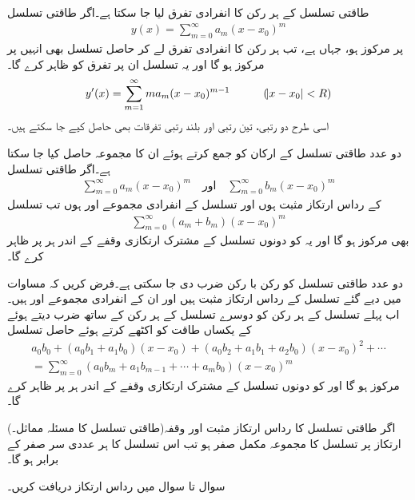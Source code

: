 \quad طاقتی تسلسل کے ہر رکن کا انفرادی تفرق لیا جا سکتا ہے۔اگر طاقتی تسلسل
\begin{align*}
y(x)=\sum_{m=0}^{\infty}a_m(x-x_0)^m
\end{align*}
  پر مرکوز ہو، جہاں  ہے، تب ہر رکن کا انفرادی تفرق لے کر حاصل تسلسل بھی انہیں  پر مرکوز ہو گا اور یہ تسلسل ان  پر  تفرق   کو ظاہر کرے گا۔ 
 \begin{align*}
y'(x)=\sum_{m=1}^{\infty} ma_m(x-x_0)^{m-1}\quad \quad \quad (\abs{x-x_0}<R)
\end{align*}
 اسی طرح دو رتبی، تین رتبی اور بلند رتبی تفرقات بھی حاصل کیے جا سکتے ہیں۔

\quad دو عدد طاقتی تسلسل کے ارکان کو جمع کرتے ہوئے ان کا مجموعہ حاصل کیا جا سکتا ہے۔اگر طاقتی تسلسل
\begin{align}\label{مساوات_بیسل_دو_عدد_تسلسل_الف}
\sum_{m=0}^{\infty} a_m(x-x_0)^m\quad \text{اور} \quad \sum_{m=0}^{\infty} b_m(x-x_0)^m
\end{align}
کے رداس ارتکاز مثبت ہوں اور تسلسل کے انفرادی مجموعے  اور  ہوں تب تسلسل
\begin{align*}
\sum_{m=0}^{\infty} (a_m+b_m)(x-x_0)^m
\end{align*}
بھی مرکوز ہو گا اور یہ  کو  دونوں تسلسل کے مشترک ارتکازی وقفے کے اندر ہر  پر ظاہر کرے گا۔

\quad دو عدد طاقتی تسلسل کو رکن با رکن ضرب دی جا سکتی ہے۔فرض کریں کہ مساوات  میں دیے گئے تسلسل کے رداس ارتکاز مثبت ہیں اور ان کے انفرادی مجموعے  اور  ہیں۔اب پہلے تسلسل کے ہر رکن کو دوسرے تسلسل کے ہر رکن کے ساتھ ضرب دیتے ہوئے  کے یکساں طاقت کو اکٹھے کرتے ہوئے حاصل تسلسل
\begin{multline*}
a_0b_0+(a_0b_1+a_1b_0)(x-x_0)+(a_0b_2+a_1b_1+a_2b_0)(x-x_0)^2+\cdots\\
=\sum_{m=0}^{\infty} (a_0b_m+a_1b_{m-1}+\cdots+a_mb_0)(x-x_0)^m
\end{multline*}
مرکوز ہو گا اور  کو دونوں تسلسل کے مشترک ارتکازی وقفے کے اندر ہر  پر ظاہر کرے گا۔

 (طاقتی تسلسل کا مسئلہ  مماثل۔)\quad اگر طاقتی تسلسل کا رداس ارتکاز مثبت اور وقفہ ارتکاز پر تسلسل کا مجموعہ مکمل صفر ہو تب اس تسلسل کا ہر عددی سر صفر کے برابر ہو گا۔

سوال  تا سوال  میں رداس ارتکاز دریافت کریں۔

